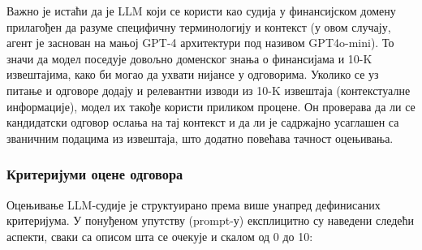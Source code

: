 Важно је истаћи да је LLM који се користи као судија у финансијском домену прилагођен да разуме специфичну терминологију и контекст (у овом случају, агент је заснован на мањој GPT-4 архитектури под називом GPT4o-mini). То значи да модел поседује довољно доменског знања о финансијама и 10-K извештајима, како би могао да ухвати нијансе у одговорима. Уколико се уз питање и одговоре додају и релевантни изводи из 10-K извештаја (контекстуалне информације), модел их такође користи приликом процене. Он проверава да ли се кандидатски одговор ослања на тај контекст и да ли је садржајно усаглашен са званичним подацима из извештаја, што додатно повећава тачност оцењивања.

\subsubsection{Критеријуми оцене одговора}

Оцењивање LLM-судије је структуирано према више унапред дефинисаних критеријума. У понуђеном упутству (prompt-у) експлицитно су наведени следећи аспекти, сваки са описом шта се очекује и скалом од 0 до 10:

